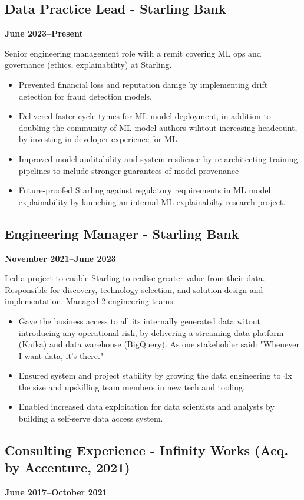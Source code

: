 \documentclass[a4paper]{scrartcl}
\begin{document}
\subsection*{Data Practice Lead - Starling Bank}
\textbf{June 2023--Present}

Senior engineering management role with a remit covering ML ops and governance (ethics,
explainability) at Starling.
\begin{itemize}
	\item Prevented financial loss and reputation damge by implementing
	      drift detection for fraud detection models.
	\item Delivered faster cycle tymes for ML model deployment, in addition to doubling the community of ML model authors wihtout increasing headcount, by investing in developer experience for ML
	\item Improved model auditability and system resilience by re-architecting training pipelines to include stronger guarantees of model provenance
	\item Future-proofed Starling against regulatory requirements in ML model explainability
	      by launching an internal ML explainabilty research project.
\end{itemize}

\subsection*{Engineering Manager - Starling Bank}
\textbf{November 2021--June 2023}

Led a project to enable Starling to realise greater value from their data. Responsible for discovery, technology selection, and solution design and implementation. Managed 2 engineering teams.
\begin{itemize}
	\item Gave the business access to all its internally generated data witout introducing any operational risk, by delivering a streaming data platform (Kafka) and data warehouse (BigQuery). As one stakeholder said: "Whenever I want data, it's there."
	\item Ensured system and project stability by growing the data engineering to 4x the size and upskilling team members in new tech and tooling.
	\item Enabled increased data exploitation for data scientists and analysts by building a self-serve data access system.
\end{itemize}

\subsection*{Consulting Experience - Infinity Works (Acq. by Accenture, 2021)}
\textbf{June 2017--October 2021}
\end{document}
